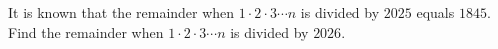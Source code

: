 It is known that the remainder when $1\cdot2\cdot3 \cdots n$ is divided by $2025$ equals $1845$. Find the remainder when $1\cdot2\cdot3 \cdots n$ is divided by $2026$.
